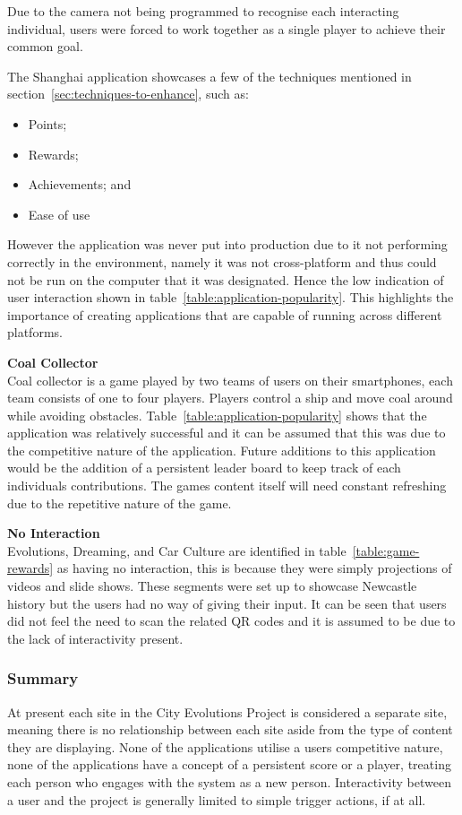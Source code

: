 \documentclass[a4paper,12pt]{article}
\begin{document}
Due to the camera not being programmed to recognise each interacting individual, users were forced to work together as a single player to achieve their common goal.

The Shanghai application showcases a few of the techniques mentioned in section~\ref{sec:techniques-to-enhance}, such as:
\begin{itemize}
	\item{Points;}
	\item{Rewards;}
	\item{Achievements; and}
	\item{Ease of use}
\end{itemize}
However the application was never put into production due to it not performing correctly in the environment, namely it was not cross-platform and thus could not be run on the computer that it was designated. Hence the low indication of user interaction shown in table~\ref{table:application-popularity}.
This highlights the importance of creating applications that are capable of running across different platforms.

\par\textbf{Coal Collector}\\
Coal collector is a game played by two teams of users on their smartphones, each team consists of one to four players. 
Players control a ship and move coal around while avoiding obstacles.
Table~\ref{table:application-popularity} shows that the application was relatively successful and it can be assumed that this was due to the competitive nature of the application.
Future additions to this application would be the addition of a persistent leader board to keep track of each individuals contributions. 
The games content itself will need constant refreshing due to the repetitive nature of the game.

\par
\textbf{No Interaction}\\
Evolutions, Dreaming, and Car Culture are identified in table~\ref{table:game-rewards} as having no interaction, this is because they were simply projections of videos and slide shows. 
These segments were set up to showcase Newcastle history but the users had no way of giving their input. 
It can be seen that users did not feel the need to scan the related QR codes and it is assumed to be due to the lack of interactivity present.

\subsubsection{Summary}
At present each site in the City Evolutions Project is considered a separate site, meaning there is no relationship between each site aside from the type of content they are displaying.
None of the applications utilise a users competitive nature, none of the applications have a concept of a persistent score or a player, treating each person who engages with the system as a new person.
Interactivity between a user and the project is generally limited to simple trigger actions, if at all.
\end{document}

